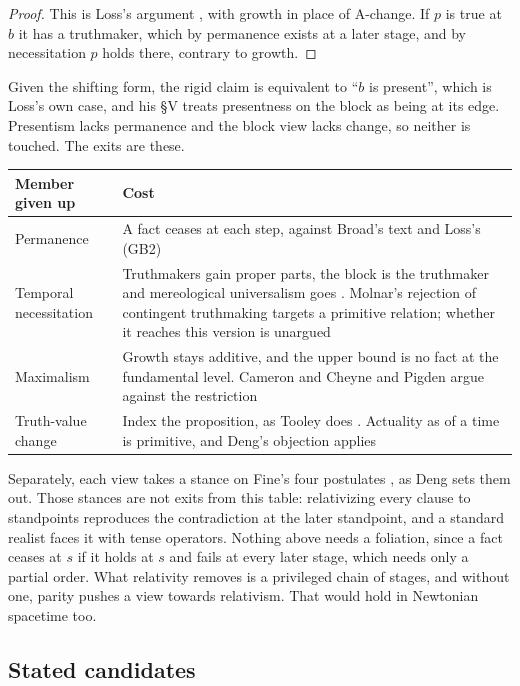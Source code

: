 \documentclass[11pt]{article}
\theoremstyle{definition}
\begin{document}
\begin{proof}
This is Loss's argument \citep[\S II]{Loss2022}, with growth in place of A-change. If $p$ is true at $b$ it has a
truthmaker, which by permanence exists at a later stage, and by necessitation $p$ holds there, contrary to growth.
\end{proof}

Given the shifting form, the rigid claim is equivalent to ``$b$ is present'', which is Loss's own case, and his \S V treats
presentness on the block as being at its edge. Presentism lacks permanence and the block view lacks change, so neither
is touched. The exits are these.

\begin{center}
\begin{tabularx}{\textwidth}{@{}lY@{}}
\toprule
Member given up & Cost\\
\midrule
Permanence & A fact ceases at each step, against Broad's text and Loss's (GB2)\\
Temporal necessitation & Truthmakers gain proper parts, the block is the truthmaker and mereological universalism goes
\citep[\S\S V--VI]{Loss2022}. Molnar's rejection of contingent truthmaking \citeyearpar[\S IX]{Molnar2000} targets a primitive
relation; whether it reaches this version is unargued\\
Maximalism & Growth stays additive, and the upper bound is no fact at the fundamental level. Cameron and Cheyne and Pigden argue
against the restriction\\
Truth-value change & Index the proposition, as Tooley does \citeyearpar{Tooley1997}. Actuality as of a time is primitive, and Deng's
objection applies\\
\bottomrule
\end{tabularx}
\end{center}

Separately, each view takes a stance on Fine's four postulates \citep{Fine2005}, as Deng sets them out. Those stances are not exits
from this table: relativizing every clause to standpoints reproduces the contradiction at the later standpoint, and a standard realist
faces it with tense operators. Nothing above needs a foliation, since a fact ceases at $s$ if it holds at $s$ and fails at every later
stage, which needs only a partial order. What relativity removes is a privileged chain of stages, and without one, parity pushes a view
towards relativism. That would hold in Newtonian spacetime too.

\subsection{Stated candidates}
\end{document}
